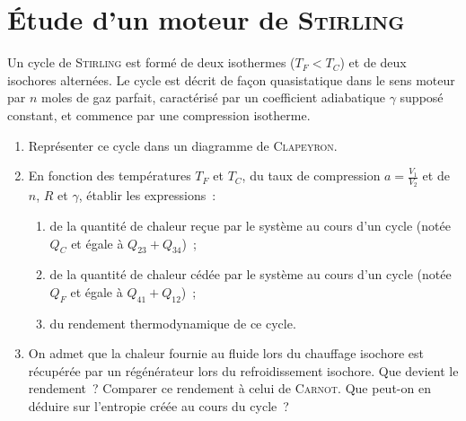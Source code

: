 \documentclass[a4paper, 10pt, final, garamond]{book}
\begin{document}
\section{Étude d'un moteur de \textsc{Stirling}}
Un cycle de \textsc{Stirling} est formé de deux isothermes ($T_F < T_C$) et de
deux isochores alternées. Le cycle est décrit de façon quasistatique dans le
sens moteur par $n$ moles de gaz parfait, caractérisé par un coefficient
adiabatique $\gamma$ supposé constant, et commence par une compression isotherme.
\begin{enumerate}
  \item Représenter ce cycle dans un diagramme de \textsc{Clapeyron}.
  \item En fonction des températures $T_F$ et $T_C$, du taux de compression $a =
    \frac{V_1}{V_2}$ et de $n$, $R$ et $\gamma$, établir les expressions~:
    \begin{enumerate}
      \item de la quantité de chaleur reçue par le système au cours d'un cycle
        (notée $Q_C$ et égale à $Q_{23}+Q_{34}$)~;
      \item de la quantité de chaleur cédée par le système au cours d'un cycle
        (notée $Q_F$ et égale à $Q_{41}+Q_{12}$)~;
      \item du rendement thermodynamique de ce cycle.
    \end{enumerate}
  \item On admet que la chaleur fournie au fluide lors du chauffage isochore est
    récupérée par un régénérateur lors du refroidissement isochore. Que devient
    le rendement~? Comparer ce rendement à celui de \textsc{Carnot}. Que peut-on
    en déduire sur l'entropie créée au cours du cycle~?
\end{enumerate}
\end{document}

